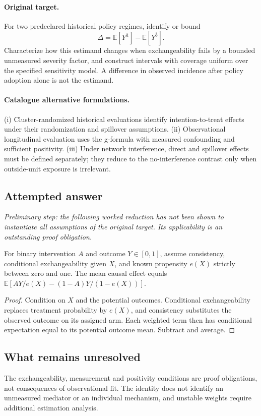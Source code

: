 \documentclass[11pt]{article}
\begin{document}
\paragraph{Original target.}
For two predeclared historical policy regimes, identify or bound
    \[\Delta=\mathbb{E}[Y^{\bar a}]-\mathbb{E}[Y^{\bar b}].\]
    Characterize how this estimand changes when exchangeability fails by a bounded unmeasured severity factor, and construct intervals with coverage uniform over the specified sensitivity model. A difference in observed incidence after policy adoption alone is not the estimand.
\paragraph{Catalogue alternative formulations.}
(i) Cluster-randomized historical evaluations identify intention-to-treat effects under their randomization and spillover assumptions. (ii) Observational longitudinal evaluation uses the g-formula with measured confounding and sufficient positivity. (iii) Under network interference, direct and spillover effects must be defined separately; they reduce to the no-interference contrast only when outside-unit exposure is irrelevant.
\subsection{Attempted answer}
\noindent\emph{Preliminary step: the following worked reduction has not been shown to instantiate all assumptions of the original target. Its applicability is an outstanding proof obligation.}

\begin{proposition}
For binary intervention $A$ and outcome $Y\in[0,1]$, assume consistency, conditional exchangeability given $X$, and known propensity $e(X)$ strictly between zero and one. The mean causal effect equals $\mathbb{E}[AY/e(X)-(1-A)Y/(1-e(X))]$.
\end{proposition}
\begin{proof}
Condition on $X$ and the potential outcomes. Conditional exchangeability replaces treatment probability by $e(X)$, and consistency substitutes the observed outcome on its assigned arm. Each weighted term then has conditional expectation equal to its potential outcome mean. Subtract and average.
\end{proof}
\subsection{What remains unresolved}
The exchangeability, measurement and positivity conditions are proof obligations, not consequences of observational fit. The identity does not identify an unmeasured mediator or an individual mechanism, and unstable weights require additional estimation analysis.
\end{document}
